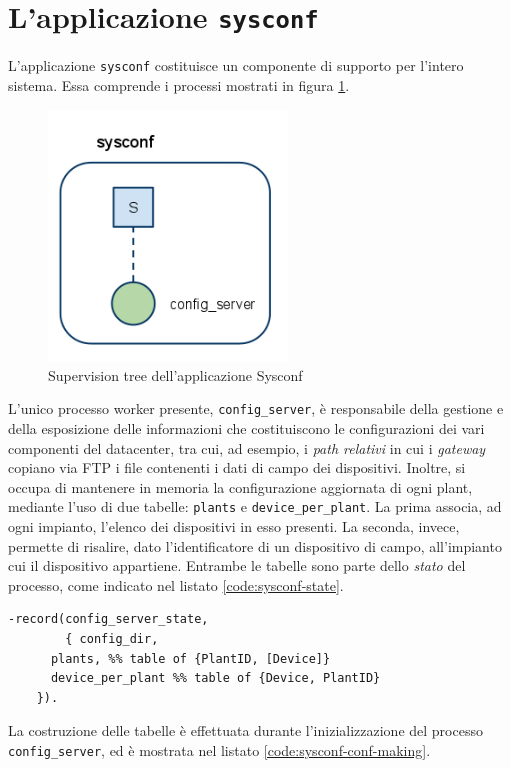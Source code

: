 \section{L'applicazione \texttt{sysconf}}
%
L'applicazione \texttt{sysconf} costituisce un componente di supporto per 
l'intero sistema. Essa comprende i processi mostrati in figura \ref{sysconfsuptree}.
%
\begin{figure}[!h]
\centering
\includegraphics[width=180pt]{img/sysconf.png}
\caption{Supervision tree dell'applicazione Sysconf}
\label{sysconfsuptree}
\end{figure}
%

%
L'unico processo worker presente, \texttt{config\_server}, \`e responsabile della 
gestione e della esposizione delle informazioni che costituiscono le configurazioni
dei vari componenti del datacenter, tra cui, ad esempio, i \emph{path relativi} in 
cui i \emph{gateway} copiano via FTP i file contenenti i dati di campo dei dispositivi.
%
Inoltre, si occupa di mantenere in memoria la configurazione aggiornata di ogni plant, 
mediante l'uso di due tabelle: \texttt{plants} e \texttt{device\_per\_plant}. 
%
La prima associa, ad ogni impianto, l'elenco dei dispositivi in esso presenti. 
%
La seconda, invece, permette di risalire, dato l'identificatore di un dispositivo di 
campo, all'impianto cui il dispositivo appartiene.
%
Entrambe le tabelle sono parte dello \emph{stato} del processo, come indicato nel 
listato \ref{code:sysconf-state}.
%
\begin{lstlisting}[caption={Stato del Config Server}, label={code:sysconf-state},frame=trBL]
-record(config_server_state, 
        { config_dir,
	  plants, %% table of {PlantID, [Device]}
	  device_per_plant %% table of {Device, PlantID}
	}).
\end{lstlisting}
%

%
La costruzione delle tabelle \`e effettuata durante l'inizializzazione del processo 
\texttt{config\_server}, ed \`e mostrata nel listato \ref{code:sysconf-conf-making}.

